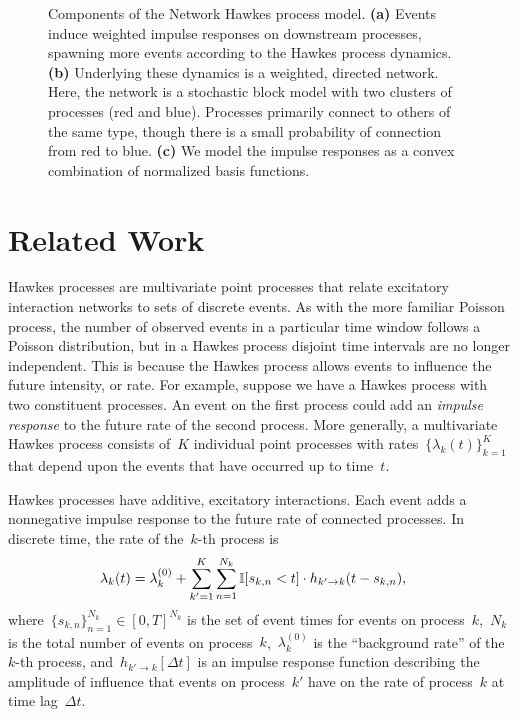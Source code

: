 \begin{figure}[t]
\begin{center}
\begin{subfigure}[b]{2.10in}
      \label{fig:hawkes_c}
    \end{subfigure}
  \end{center}
  \caption[Components of the discrete time Hawkes process model]{
    Components of the Network Hawkes process model.
    \textbf{(a)} Events induce weighted impulse responses on downstream processes, spawning more events according to the Hawkes process dynamics.
    \textbf{(b)} Underlying these dynamics is a weighted, directed network. Here, the network is a stochastic block model with two clusters of processes (red and blue). Processes primarily connect to others of the same type, though there is a small probability of connection from red to blue.
    \textbf{(c)} We model the impulse responses as a convex combination of normalized basis functions.}
\label{fig:hawkes}
\end{figure}

\section{Related Work}
Hawkes processes \cite{Hawkes-1971} are multivariate point processes that relate excitatory interaction networks to sets of discrete events. 
As with the more familiar Poisson process, the number of observed events in a particular time window follows a Poisson distribution, 
but in a Hawkes process disjoint time intervals are no longer independent.
This is because the Hawkes process allows events to influence the future intensity, or rate.
For example, suppose we have a Hawkes process with two constituent processes.
An event on the first process could add an \emph{impulse response} to the future rate of the second process.
More generally, a multivariate Hawkes process consists of~$K$ individual point processes with rates~${\{\lambda_k(t)\}_{k=1}^K}$ that depend upon the events that have occurred up to time~$t$.   

Hawkes processes have additive, excitatory interactions.
Each event adds a nonnegative impulse response to the future rate of connected processes.
In discrete time, the rate of the~$k$-th process is
\begin{align}
\label{eq:cont_hawkes_rate}
 \lambda_{k}(t) &= \lambda_k^{(0)} + \sum_{k' = 1}^K \sum_{n=1}^{N_k} \mathbb{I}[s_{k,n}<t] \cdot h_{k' \to k}(t-s_{k,n}),
\end{align}
where~${\{s_{k,n}\}_{n=1}^{N_k} \in [0,T]^{N_k}}$ is the set of event times for events on process~$k$,~$N_k$ is the total number of events on process~$k$,~$\lambda_k^{(0)}$ is the ``background rate'' of the~$k$-th process, and~${h_{k' \to k}[\Delta t]}$ is an impulse response function describing the amplitude of influence that events on process~$k'$ have on the rate of process~$k$ at time lag~${\Delta t}$.

